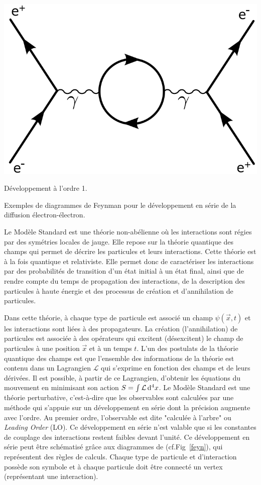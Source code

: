 {	\includegraphics[width=\marginparwidth]{SM/feyn3.png}
	\captionsetup{type=subfigure}\caption{Développement à l'ordre \num{1}.}
	\captionsetup{type=figure}\caption{Exemples de diagrammes de Feynman pour le développement en série de la diffusion électron-électron.}
	\label{feyn}
}
Le Modèle Standard est une théorie non-abélienne où les interactions sont régies par des symétries locales de jauge. Elle repose sur la théorie quantique des champs qui permet de décrire les particules et leurs interactions. Cette théorie est à la fois quantique et relativiste. Elle permet donc de caractériser les interactions par des probabilités de transition d'un état initial à un état final, ainsi que de rendre compte du temps de propagation des interactions, de la description des particules à haute énergie et des processus de création et d'annihilation de particules.

Dans cette théorie, à chaque type de particule est associé un champ $\psi(\vec{x},t)$ et les interactions sont liées à des propagateurs. La création (l'annihilation) de particules est associée à des opérateurs qui excitent (désexcitent) le champ de particules à une position $\vec{x}$ et à un temps $t$. L'un des postulats de la théorie quantique des champs est que l'ensemble des informations de la théorie est contenu dans un Lagrangien $\mathcal{L}$ qui s'exprime en fonction des champs et de leurs dérivées. Il est possible, à partir de ce Lagrangien, d'obtenir les équations du mouvement en minimisant son action $S=\int\mathcal{L}\mathop{}\!\mathrm{d^4}{x}$.
Le Modèle Standard est une théorie perturbative, c'est-à-dire que les observables sont calculées par une méthode qui s'appuie sur un développement en série dont la précision augmente avec l'ordre. Au premier ordre, l'observable est dite "calculée à l'arbre" ou \textit{Leading Order} (LO). Ce développement en série n'est valable que si les constantes de couplage des interactions restent faibles devant l'unité. Ce développement en série peut être schématisé grâce aux diagrammes de  (cf.Fig~\ref{feyn}), qui représentent des règles de calculs. Chaque type de particule et d'interaction possède son symbole et à chaque particule doit être connecté un vertex (représentant une interaction).

